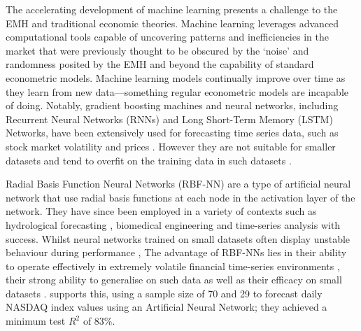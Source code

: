 \documentclass[11pt,a4paper]{article}
\newcommand{\citeboth}[1]{\citeauthor{#1} \citep{#1}}
\begin{document}
The accelerating development of machine learning presents a challenge to the EMH
and traditional economic theories. 
Machine learning leverages advanced computational 
tools capable of uncovering patterns and inefficiencies 
in the market that were previously thought to be obscured by the 
‘noise’ and randomness posited by the EMH and beyond the capability 
of standard econometric models. Machine learning models continually 
improve over time as they learn from new data—something regular 
econometric models are incapable of doing. Notably, gradient boosting machines and neural networks, including 
Recurrent Neural Networks (RNNs) and Long Short-Term Memory (LSTM) 
Networks, have been extensively used for forecasting time series data, 
such as stock market volatility \citep{cho2022forecasting,praveenraj2023} and prices \citep{zhang2022lstm,song2023forecasting,dutta2024hybrid}. However they 
are not suitable for smaller datasets and tend to overfit on the training data
in such datasets \citep{foster1992}.

Radial Basis Function Neural Networks (RBF-NN) are a type of artificial 
neural network that use radial basis functions at each node in the 
activation layer of the network. They have since been employed in a variety of contexts such as 
hydrological forecasting \citep{chang2001}, biomedical engineering 
\citep{ibrikci2002} and time-series analysis \citep{xiong2015} with success. 
Whilst neural networks trained on small datasets often display unstable 
behaviour during performance \citep{lebaron1998}, The advantage of 
RBF-NNs lies in their ability to 
operate effectively in extremely volatile financial time-series 
environments \citep{cafferata2019}, their strong ability to 
generalise on such data \citep{sharkawy2020} as well as their efficacy on small datasets \citep{kosarac2022}. 
\citeboth{esfandyari2016}
supports this, using a sample size of 70 and 29 to forecast daily NASDAQ 
index values using an Artificial Neural Network; they achieved a minimum
test $R^2$ of 83$\%$. 
\end{document}
